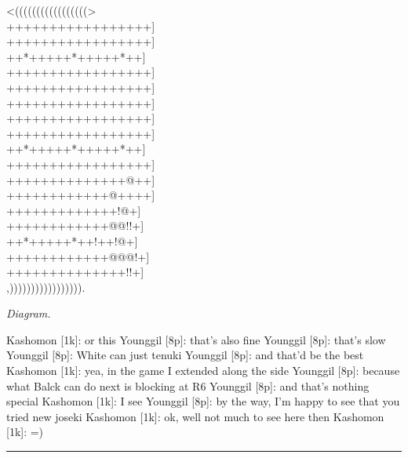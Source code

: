 \documentclass[letterpaper,12pt]{memoir}
\newcounter{GoFigure}[part]
\newcommand{\gofigure}{%
 \stepcounter{GoFigure}
 \centerline{\textit{Diagram.\thinspace\arabic{GoFigure}}}
}
\begin{document}
\begin{minipage}[t]{0.5\textwidth}
{\gnos
<(((((((((((((((((>\\
+++++++++++++++++]\\
+++++++++++++++++]\\
++*+++++*+++++*++]\\
+++++++++++++++++]\\
+++++++++++++++++]\\
+++++++++++++++++]\\
+++++++++++++++++]\\
+++++++++++++++++]\\
++*+++++*+++++*++]\\
+++++++++++++++++]\\
++++++++++++++@++]\\
++++++++++++@++++]\\
+++++++++++++!@+]\\
++++++++++++@@!!+]\\
++*+++++*++!++!@+]\\
++++++++++++@@@!+]\\
++++++++++++++!!+]\\
,))))))))))))))))).\\
}
\gofigure
\end{minipage}
\begin{minipage}[t]{0.5\textwidth}
\setlength{\parskip}{0.5em}
Kashomon [1k]: or this
Younggil [8p]: that's also fine
Younggil [8p]: that's slow
Younggil [8p]: White can just tenuki
Younggil [8p]: and that'd be the best
Kashomon [1k]: yea, in the game I extended along the side
Younggil [8p]: because what Balck can do next is blocking at R6
Younggil [8p]: and that's nothing special
Kashomon [1k]: I see
Younggil [8p]: by the way, I'm happy to see that you tried new joseki
Kashomon [1k]: ok, well not much to see here then
Kashomon [1k]: =)


\end{minipage}
\vfill

\rule{\textwidth}{0.5pt}
\end{document}
